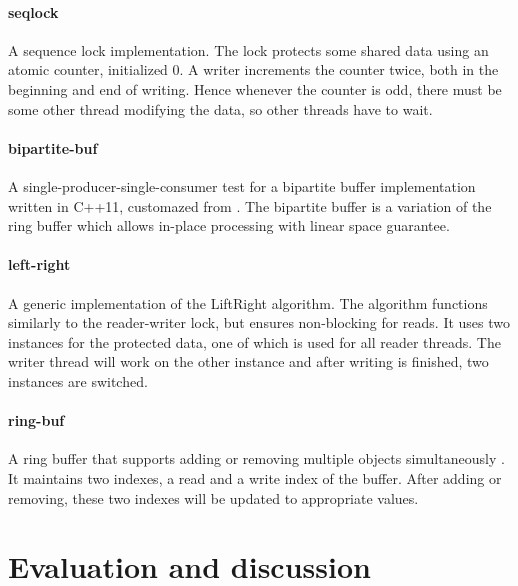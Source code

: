 \paragraph{seqlock} A sequence lock implementation. The lock protects some shared data using an atomic counter, initialized 0. A writer increments the counter twice, both in the beginning and end of writing. Hence whenever the counter is odd, there must be some other thread modifying the data, so other threads have to wait. 

\paragraph{bipartite-buf} A single-producer-single-consumer test for a bipartite buffer implementation written in C++11, customazed from \cite{lockfree-DNedic}. The bipartite buffer is a variation of the ring buffer which allows in-place processing with linear space guarantee. 

\paragraph{left-right} A generic implementation \cite{lockfree-xenium} of the LiftRight algorithm\cite{left-right}. The algorithm functions similarly to the reader-writer lock, but ensures non-blocking for reads. It uses two instances for the protected data, one of which is used for all reader threads. The writer thread will work on the other instance and after writing is finished, two instances are switched. 


\paragraph{ring-buf} A ring buffer that supports adding or removing multiple objects simultaneously \cite{lockfree-DNedic}. It maintains two indexes, a read and a write index of the buffer. After adding or removing, these two indexes will be updated to appropriate values. 



\section{Evaluation and discussion}



